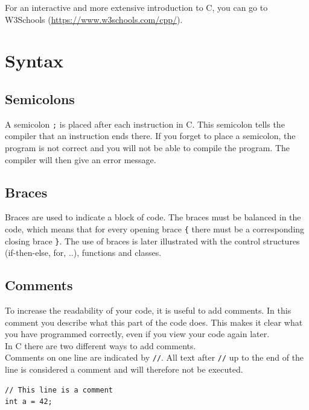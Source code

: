 \documentclass[11pt,fleqn]{book} %
\def\Cpp{{C\nolinebreak[4]\hspace{-.05em}\raisebox{.4ex}{\tiny\bf ++}}}
\begin{document}
\noindent For an interactive and more extensive introduction to \Cpp, you can go to W3Schools (\url{https://www.w3schools.com/cpp/}).

\nocite{w3schools:cpp, tutorialspoint:cpp}

\section{Syntax}
\subsection{Semicolons}
A semicolon \texttt{;} is placed after each instruction in \Cpp{}. This semicolon tells the compiler that an instruction ends there. If you forget to place a semicolon, the program is not correct and you will not be able to compile the program. The compiler will then give an error message.

\subsection{Braces}
Braces \texttt{{}} are used to indicate a block of code. The braces must be balanced in the code, which means that for every opening brace \texttt{\{} there must be a corresponding closing brace \texttt{\}}. The use of braces is later illustrated with the control structures (if-then-else, for, ..), functions and classes.

\subsection{Comments}
To increase the readability of your code, it is useful to add comments. In this comment you describe what this part of the code does. This makes it clear what you have programmed correctly, even if you view your code again later.\\

\noindent In \Cpp{} there are two different ways to add comments.\\
Comments on one line are indicated by \texttt{//}. All text after \texttt{//} up to the end of the line is considered a comment and will therefore not be executed.

\begin{example}[Comments]
	\phantom{ }
	\begin{verbatim}
// This line is a comment
int a = 42;
	\end{verbatim}
\end{example}
\end{document}
